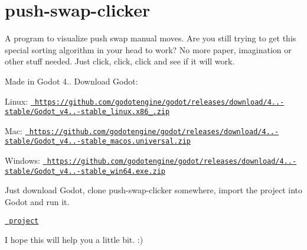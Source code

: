 \chapter{push-\/swap-\/clicker}
\hypertarget{md_src_2checker__bonus_2testers_2push-swap-clicker}{}\label{md_src_2checker__bonus_2testers_2push-swap-clicker}
\label{md_src_2checker__bonus_2testers_2push-swap-clicker_autotoc_md1}%
%
A program to visualize push swap manual moves. Are you still trying to get this special sorting algorithm in your head to work? No more paper, imagination or other stuff needed. Just click, click, click and see if it will work.

Made in Godot 4.. Download Godot\+:

Linux\+: \href{https://github.com/godotengine/godot/releases/download/4.1.1-stable/Godot_v4.1.1-stable_linux.x86_64.zip}{\texttt{ https\+://github.\+com/godotengine/godot/releases/download/4..-\/stable/\+Godot\+\_\+v4..-\/stable\+\_\+linux.\+x86\+\_.\+zip}}

Mac\+: \href{https://github.com/godotengine/godot/releases/download/4.1.1-stable/Godot_v4.1.1-stable_macos.universal.zip}{\texttt{ https\+://github.\+com/godotengine/godot/releases/download/4..-\/stable/\+Godot\+\_\+v4..-\/stable\+\_\+macos.\+universal.\+zip}}

Windows\+: \href{https://github.com/godotengine/godot/releases/download/4.1.1-stable/Godot_v4.1.1-stable_win64.exe.zip}{\texttt{ https\+://github.\+com/godotengine/godot/releases/download/4..-\/stable/\+Godot\+\_\+v4..-\/stable\+\_\+win64.\+exe.\+zip}}

Just download Godot, clone push-\/swap-\/clicker somewhere, import the project into Godot and run it.

\href{https://github.com/stevebalk/push-swap-clicker}{\texttt{ project}}

I hope this will help you a little bit. \+:)



 